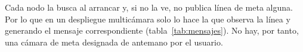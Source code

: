 Cada nodo la busca al arrancar y, si no la ve, no publica línea de meta alguna. Por lo que en un despliegue multicámara solo lo hace la que observa la línea y generando el mensaje correspondiente (tabla~\ref{tab:mensajes}). No hay, por tanto, una cámara de meta designada de antemano por el usuario.
